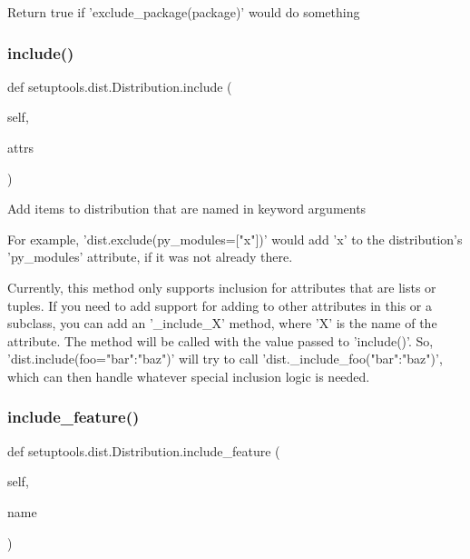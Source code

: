 \begin{DoxyVerb}Return true if 'exclude_package(package)' would do something\end{DoxyVerb}
 \mbox{\label{classsetuptools_1_1dist_1_1_distribution_a2306d43f883208c7a145e26056ee4fc9}} 
\subsubsection{\texorpdfstring{include()}{include()}}
{\footnotesize\ttfamily def setuptools.\+dist.\+Distribution.\+include (\begin{DoxyParamCaption}\item[{}]{self,  }\item[{}]{attrs }\end{DoxyParamCaption})}

\begin{DoxyVerb}Add items to distribution that are named in keyword arguments

For example, 'dist.exclude(py_modules=["x"])' would add 'x' to
the distribution's 'py_modules' attribute, if it was not already
there.

Currently, this method only supports inclusion for attributes that are
lists or tuples.  If you need to add support for adding to other
attributes in this or a subclass, you can add an '_include_X' method,
where 'X' is the name of the attribute.  The method will be called with
the value passed to 'include()'.  So, 'dist.include(foo={"bar":"baz"})'
will try to call 'dist._include_foo({"bar":"baz"})', which can then
handle whatever special inclusion logic is needed.
\end{DoxyVerb}
 \mbox{\label{classsetuptools_1_1dist_1_1_distribution_ab1eb484dfaf40518287829723ef5a456}} 
\subsubsection{\texorpdfstring{include\+\_\+feature()}{include\_feature()}}
{\footnotesize\ttfamily def setuptools.\+dist.\+Distribution.\+include\+\_\+feature (\begin{DoxyParamCaption}\item[{}]{self,  }\item[{}]{name }\end{DoxyParamCaption})}

